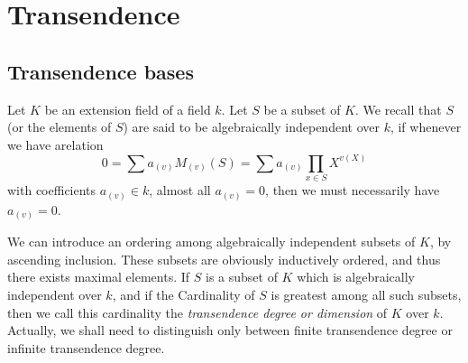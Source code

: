 \section{Transendence}
\subsection{Transendence bases}
Let \(K\) be an extension field of a field \(k\). Let \(S\) be a subset of
\(K\). We recall that \(S\) (or the elements of \(S\)) are said to be
algebraically independent over \(k\), if whenever we have arelation
\[
  0=\sum a_{(v)}M_{(v)}(S)=\sum a_{(v)}\prod_{x\in S}X^{v(X)}
\]
with coefficients \(a_{(v)}\in k\), almost all \(a_{(v)}=0\), then we must
necessarily have \(a_{(v)}=0\).

We can introduce an ordering among algebraically independent subsets of
\(K\), by ascending inclusion. These subsets are obviously inductively
ordered, and thus there exists maximal elements. If \(S\) is a subset of
\(K\) which is algebraically independent over \(k\), and if the Cardinality
of \(S\) is greatest among all such subsets, then we call this cardinality
the \emph{transendence degree or dimension} of \(K\) over \(k\). Actually,
we shall need to distinguish only between finite transendence degree or
infinite transendence degree.

